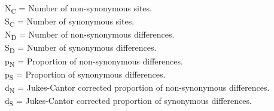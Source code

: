 \documentclass[11pt]{article}
\begin{document}
\begin{table}
N\textsubscript{C} = Number of non-synonymous sites. \\
S\textsubscript{C} = Number of synonymous sites. \\
N\textsubscript{D} = Number of non-synonymous differences. \\
S\textsubscript{D} = Number of synonymous differences. \\
p\textsubscript{N} = Proportion of non-synonymous differences. \\
p\textsubscript{S} = Proportion of synonymous differences. \\
d\textsubscript{N} = Jukes-Cantor corrected proportion of
    non-synonymous differences. \\
d\textsubscript{S} = Jukes-Cantor corrected proportion of
    synonymous differences.
\end{table}
\end{document}
